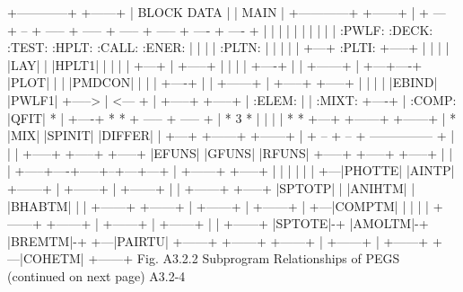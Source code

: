 \newpage {} 
\begin{center}
\begin{boxedverbatim}
     +------------+         +------+
     | BLOCK DATA |         | MAIN |
     +------------+         +------+
                                |
     + --- + -- + ----- + ----- + ----- + ----- + ---- + ---- +
     |     |            |       |       |       |      |      |
     |     |         :PWLF:  :DECK:  :TEST:  :HPLT: :CALL: :ENER:
     |     |            |       |    :PLTN:     |      |
     |     |            |     +---+  :PLTI:  +-----+   |
     |     |            |     |LAY|     |    |HPLT1|   |
     |     |            |     +---+     |    +-----+   |
     |     |            |            +----+     |      |
  +------+ |        +---+----+       |PLOT|     |      |
  |PMDCON| |        |        |       +----+     |      |
  +------+ |     +-----+  +-----+       |       |      |
           |     |EBIND|  |PWLF1|       +-----> | <--- +
           |     +-----+  +-----+               |
        :ELEM:               |                  |
        :MIXT:            +----+                |
        :COMP:            |QFIT|                *
           |              +----+               * *
   + ----- + ----- +         |                * 3 *
   |       |       |         |                 * *
 +---+ +------+ +------+     |                  *
 |MIX| |SPINIT| |DIFFER|     |
 +---+ +------+ +------+     |
                        + -- + -- + --------------- +
                        |         |                 |
                     +-----+   +-----+           +-----+
                     |EFUNS|   |GFUNS|           |RFUNS|
                     +-----+   +-----+           +-----+
                        |         |                 |
    +-----+----+-----+--+---+---+ |   +------+   +-----+
    |     |    |     |      |   | +---|PHOTTE|   |AINTP|
 +------+ | +------+ | +------+ | |   +------+   +-----+
 |SPTOTP| | |ANIHTM| | |BHABTM| | |   +------+
 +------+ | +------+ | +------+ | +---|COMPTM|
          |          |          | |   +------+
 +------+ | +------+ | +------+ | |   +------+
 |SPTOTE|-+ |AMOLTM|-+ |BREMTM|-+ +---|PAIRTU|
 +------+   +------+   +------+   |   +------+
                                  |   +------+
                                  +---|COHETM|
                                      +------+
      Fig. A3.2.2  Subprogram Relationships of PEGS
                      (continued on next page)
 A3.2-4
\end{boxedverbatim} 
\end{center}
